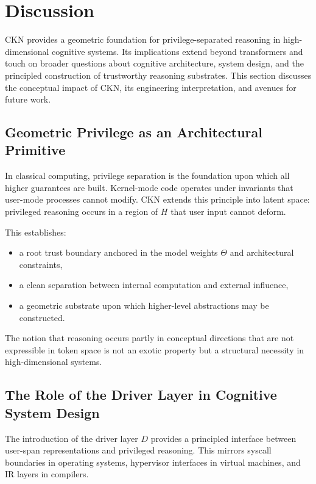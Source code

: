 \documentclass[11pt,a4paper]{article}
\begin{document}
\section{Discussion}

CKN provides a geometric foundation for privilege-separated reasoning in high-dimensional cognitive systems. Its implications extend beyond transformers and touch on broader questions about cognitive architecture, system design, and the principled construction of trustworthy reasoning substrates. This section discusses the conceptual impact of CKN, its engineering interpretation, and avenues for future work.

\subsection{Geometric Privilege as an Architectural Primitive}

In classical computing, privilege separation is the foundation upon which all higher guarantees are built. Kernel-mode code operates under invariants that user-mode processes cannot modify. CKN extends this principle into latent space: privileged reasoning occurs in a region of $H$ that user input cannot deform.

This establishes:
\begin{itemize}
    \item a root trust boundary anchored in the model weights $\Theta$ and architectural constraints,
    \item a clean separation between internal computation and external influence,
    \item a geometric substrate upon which higher-level abstractions may be constructed.
\end{itemize}

The notion that reasoning occurs partly in conceptual directions that are not expressible in token space is not an exotic property but a structural necessity in high-dimensional systems.

\subsection{The Role of the Driver Layer in Cognitive System Design}

The introduction of the driver layer $D$ provides a principled interface between user-span representations and privileged reasoning. This mirrors syscall boundaries in operating systems, hypervisor interfaces in virtual machines, and IR layers in compilers.
\end{document}
